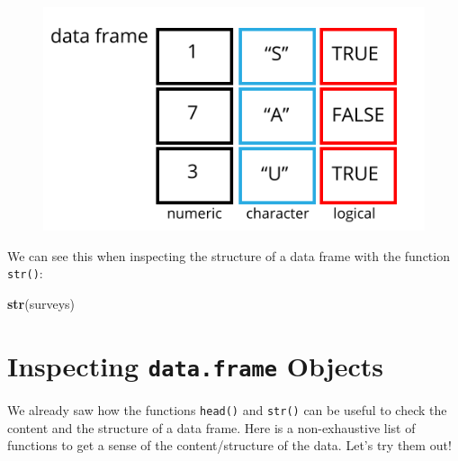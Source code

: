 \documentclass[]{book}
\newenvironment{Shaded}{\begin{snugshade}}{\end{snugshade}}
\newcommand{\KeywordTok}[1]{\textcolor[rgb]{0.13,0.29,0.53}{\textbf{#1}}}
\newcommand{\NormalTok}[1]{#1}
\begin{document}
\begin{figure}
\centering
\includegraphics{./img/data-frame.png}
\caption{}
\end{figure}

We can see this when inspecting the structure of a data frame with the
function \texttt{str()}:

\begin{Shaded}
\begin{Highlighting}[]
\KeywordTok{str}\NormalTok{(surveys)}
\end{Highlighting}
\end{Shaded}

\section{\texorpdfstring{Inspecting \texttt{data.frame}
Objects}{Inspecting data.frame Objects}}\label{inspecting-data.frame-objects}

We already saw how the functions \texttt{head()} and \texttt{str()} can
be useful to check the content and the structure of a data frame. Here
is a non-exhaustive list of functions to get a sense of the
content/structure of the data. Let's try them out!
\end{document}
